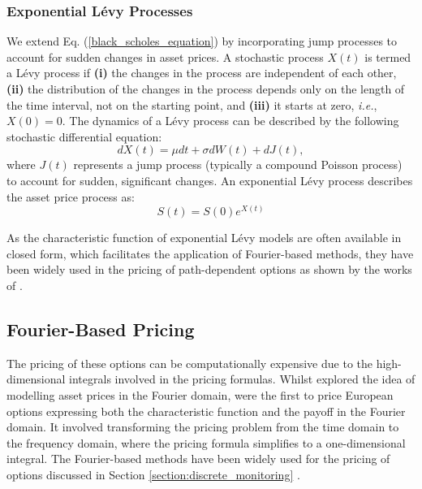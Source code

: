 \documentclass[a4paper]{report}
\begin{document}
\subsubsection{Exponential L\'evy Processes}
We extend Eq. (\ref{black_scholes_equation}) by incorporating jump processes to account for sudden changes in asset prices. A stochastic process $X(t)$ is termed a L\'evy process if \textbf{(i)} the changes in the process are independent of each other, \textbf{(ii)} the distribution of the changes in the process depends only on the length of the time interval, not on the starting point, and \textbf{(iii)} it starts at zero, \textit{i.e.}, $X(0) = 0$. The dynamics of a L\'evy process can be described by the following stochastic differential equation:
\begin{equation}
dX(t) = \mu dt + \sigma dW(t) + dJ(t),
\end{equation}
where $J(t)$ represents a jump process (typically a compound Poisson process) to account for sudden, significant changes. An exponential L\'evy process describes the asset price process as:
\begin{equation}
S(t) = S(0)e^{X(t)}	
\end{equation}

As the characteristic function of exponential L\'evy models are often available in closed form, which facilitates the application of Fourier-based methods, they have been widely used in the pricing of path-dependent options as shown by the works of \citet{fusai2016spitzer, kwok2011efficient, feng2008pricing, phelan2019hilbert}.

\subsection{Fourier-Based Pricing}
The pricing of these options can be computationally expensive due to the high-dimensional integrals involved in the pricing formulas. Whilst \citet{heston1993closed} explored the idea of modelling asset prices in the Fourier domain, \citet{carr1999option} were the first to price European options expressing both the characteristic function and the payoff in the Fourier domain. It involved transforming the pricing problem from the time domain to the frequency domain, where the pricing formula simplifies to a one-dimensional integral. The Fourier-based methods have been widely used for the pricing of options discussed in Section \ref{section:discrete_monitoring} \citep{eberlein2010analysis}.
\end{document}

